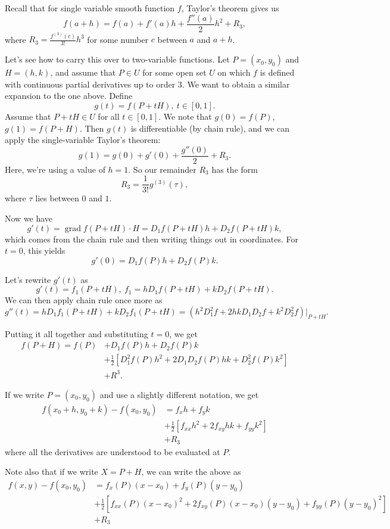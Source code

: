\documentclass{article}
\DeclareMathOperator{\grd}{grad}
\begin{document}
Recall that for single variable smooth function $f$, Taylor's theorem gives us 
\[f(a+h) = f(a) + f'(a)h + \frac{f''(a)}{2} h^2 + R_3,\]
where $R_3 = \frac{f^{(3)}(c)}{3!}h^3$ for some number $c$ between $a$ and $a+h$.

Let's see how to carry this over to two-variable functions. Let $P=(x_0,y_0)$ and $H=(h,k)$, and assume
that $P \in U$ for some open set $U$ on which $f$ is defined with continuous partial derivatives up to order $3$.
We want to obtain a similar expansion to the one above. Define 
\[g(t) = f(P+tH),\ t \in [0,1].\]
Assume that $P+tH \in U$ for all $t \in [0,1]$. We note that $g(0) = f(P)$, $g(1) = f(P+H)$. 
Then $g(t)$ is differentiable (by chain rule), and we can apply the single-variable Taylor's theorem:
\[g(1) = g(0) + g'(0) + \frac{g''(0)}{2}+R_3.\]
Here, we're using a value of $h=1$. So our remainder $R_3$ has the form
\[R_3 = \frac{1}{3!} g^{(3)}(\tau),\]
where $\tau$ lies between $0$ and $1$.

Now we have
\[g'(t) = \grd f(P+tH)\cdot H = D_1 f(P+tH)h + D_2 f(P+tH)k,\]
which comes from the chain rule and then writing things out in coordinates.
For $t=0$, this yields
\[g'(0) = D_1 f(P) h + D_2 f(P)k.\]

Let's rewrite $g'(t)$ as 
\[g'(t) = f_1(P+tH),\ f_1 = hD_1 f(P+tH) + kD_2 f(P+tH).\]
We can then apply chain rule once more as 
\[g''(t) = hD_1f_1(P+tH) + kD_2f_1(P+tH)=\left( h^2 D_1^2 f + 2hkD_1 D_2 f + k^2 D_2^2 f \right)\bigg\vert_{P+tH}.\]

Putting it all together and substituting $t=0$, we get
\begin{align*}
    f(P+H)=f(P) &+ D_1f(P)h + D_2 f(P)k \\
    &+ \frac{1}{2}\left[ D_1^2 f(P)h^2 + 2D_1D_2f(P)hk + D_2^2 f(P) k^2\right]\\
    &+ R^3.
\end{align*}

If we write $P=(x_0,y_0)$ and use a slightly different notation, we get
\begin{align*}
    f(x_0+h,y_0+k) - f(x_0,y_0) &= f_{x}h + f_{y}k\\
    &+\frac{1}{2}\left[ f_{xx} h^2 + 2f_{xy}hk + f_{yy}k^2 \right]\\
    &+R_3
\end{align*}
where all the derivatives are understood to be evaluated at $P$.

Note also that if we write $X=P+H$, we can write the above as 
\begin{align*}
    f(x,y) - f(x_0,y_0) &= f_x(P) (x-x_0) + f_y(P) (y-y_0) \\
    &+ \frac{1}{2}[f_{xx}(P) (x-x_0)^2 + 2f_{xy}(P)(x-x_0)(y-y_0)+f_{yy}(P)(y-y_0)^2]\\
    &+ R_3
\end{align*}
\end{document}
